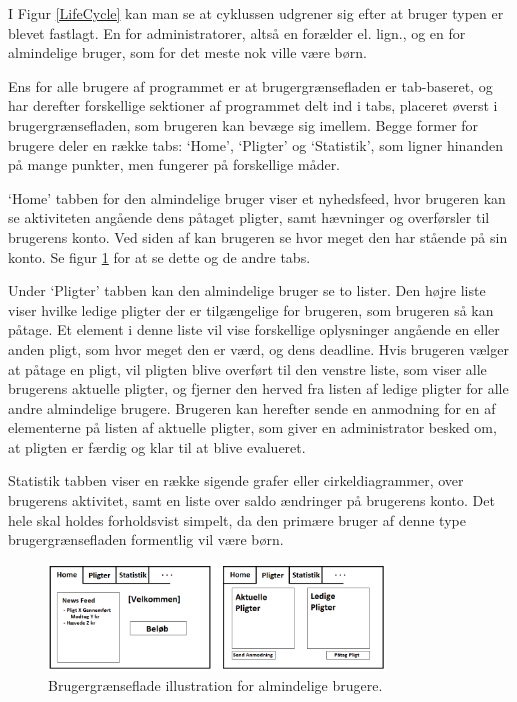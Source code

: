 I Figur \ref{LifeCycle} kan man se at cyklussen udgrener sig efter at bruger typen er blevet fastlagt. En for administratorer, altså en forælder el. lign., og en for almindelige bruger, som for det meste nok ville være børn.

Ens for alle brugere af programmet er at brugergrænsefladen er tab-baseret, og har derefter forskellige sektioner af programmet delt ind i tabs, placeret øverst i brugergrænsefladen, som brugeren kan bevæge sig imellem. Begge former for brugere deler en række tabs: ‘Home’, ‘Pligter’ og ‘Statistik’, som ligner hinanden på mange punkter, men fungerer på forskellige måder.

‘Home’ tabben for den almindelige bruger viser et nyhedsfeed, hvor brugeren kan se aktiviteten angående dens påtaget pligter, samt hævninger og overførsler til brugerens konto. Ved siden af kan brugeren se hvor meget den har stående på sin konto. Se figur \ref{BarnUI} for at se dette og de andre tabs.

Under ‘Pligter’ tabben kan den almindelige bruger se to lister. Den højre liste viser hvilke ledige pligter der er tilgængelige for brugeren, som brugeren så kan påtage. Et element i denne liste vil vise forskellige oplysninger angående en eller anden pligt, som hvor meget den er værd, og dens deadline. Hvis brugeren vælger at påtage en pligt, vil pligten blive overført til den venstre liste, som viser alle brugerens aktuelle pligter, og fjerner den herved fra listen af ledige pligter for alle andre almindelige brugere. Brugeren kan herefter sende en anmodning for en af elementerne på listen af aktuelle pligter, som giver en administrator besked om, at pligten er færdig og klar til at blive evalueret.

Statistik tabben viser en række sigende grafer eller cirkeldiagrammer, over brugerens aktivitet, samt en liste over saldo ændringer på brugerens konto. Det hele skal holdes forholdsvist simpelt, da den primære bruger af denne type brugergrænsefladen formentlig vil være børn.

\begin{figure}[H]
\centering
\includegraphics[width=0.8\textwidth]{Billeder/BarnUI.png}
\caption{Brugergrænseflade illustration for almindelige brugere.}
\label{BarnUI}
\end{figure}